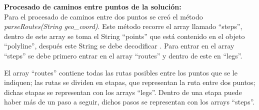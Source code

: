 \vspace{0.06in}
\textbf{Procesado de caminos entre puntos de la solución:}\\
Para el procesado de caminos entre dos puntos se creó el método \textit{parseRoutes(String geo\_coord)}. Este método recorre el array llamado \enquote{steps}, dentro de este array se toma el String \enquote{points} que está contenido en el objeto \enquote{polyline}, después este String se debe decodificar \cite{decode_polyline}. Para entrar en el array \enquote{steps} se debe primero entrar en el array \enquote{routes} y dentro de este en \enquote{legs}.\newline

El array \enquote{routes} contiene todas las rutas posibles entre los puntos que se le indiquen; las rutas se dividen en etapas, que representan la ruta entre dos puntos; dichas etapas se representan con los arrays \enquote{legs}. Dentro de una etapa puede haber más de un paso a seguir, dichos pasos se representan con los arrays \enquote{steps}.\newline

